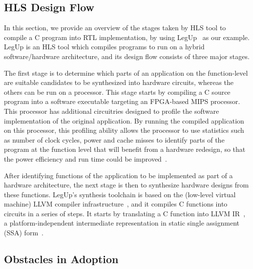 \subsection{HLS Design Flow}
\label{bg:sub:hls_design}

In this section, we provide an overview of the stages taken by HLS tool to
compile a C program into RTL implementation, by using LegUp~\cite{legup,
canis13} as our example.  LegUp is an HLS tool which compiles programs to run
on a hybrid software/hardware architecture, and its design flow consists of
three major stages.

The first stage is to determine which parts of an application on the
function-level are suitable candidates to be synthesized into hardware
circuits, whereas the others can be run on a processor.  This stage starts by
compiling a C source program into a software executable targeting an FPGA-based
MIPS processor.  This processor has additional circuitries designed to profile
the software implementation of the original application.  By running the
compiled application on this processor, this profiling ability allows the
processor to use statistics such as number of clock cycles, power and cache
misses to identify parts of the program at the function level that will benefit
from a hardware redesign, so that the power efficiency and run time could be
improved~\cite{canis13}.

After identifying functions of the application to be implemented as part of a
hardware architecture, the next stage is then to synthesize hardware designs
from these functions.  LegUp's synthesis toolchain is based on the (low-level
virtual machine) LLVM compiler infrastructure~\cite{llvm}, and it compiles
C functions into circuits in a series of steps.  It starts by translating a
C function into LLVM IR~\cite{llvm_ir}, a platform-independent intermediate
representation in static single assignment (SSA) form~\cite{cytron91}.




\subsection{Obstacles in Adoption}
\label{sub:obstacles_in_adoption}


